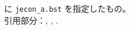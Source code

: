 \documentclass[10pt]{jarticle}
\begin{document}
\verb|| に \verb|jecon_a.bst| を指定したもの。
\vspace{1em}\\
引用部分：\citet{brezis93:_leapf_inter_compet},
\citet{ito85:_inte_trad}, \citet{brezis93:_leapf_inter_compet}.

\nocite{*}




\end{document}
